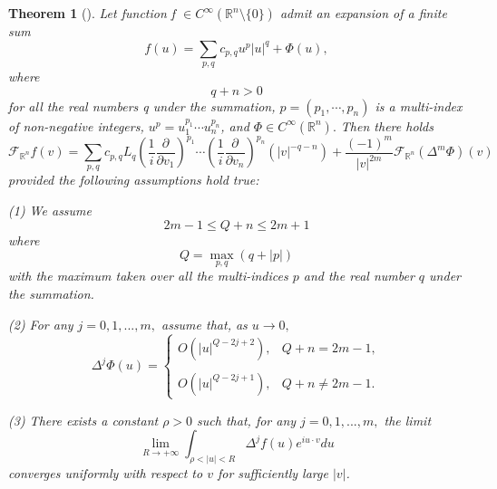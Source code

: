 \documentclass{amsart}
\newtheorem{theorem}{Theorem}[section]
\theoremstyle{definition}
\theoremstyle{remark}
\numberwithin{equation}{section}
\newcommand{\R}{\mathbb{R}}
\begin{document}
\begin{theorem} [\cite{SW1979}] \label{2023-09-30 17:52:36}
    Let function f $\in C^\infty(\R^n \setminus\{0\})$ admit an expansion of a finite sum
    \[
f(u)=\sum\limits_{p,q} c_{p,q} u^p |u|^q + \Phi(u),
\] where  \[
q+n>0
\] for all the real numbers q under the summation, $p =(p_1,\cdots,p_n)$ is a multi-index of non-negative integers,
    $u^p=u_1^{p_1}\cdots u_n^{p_n}$,
     and $\Phi \in C^\infty(\R^n).$  Then there holds \[
\mathcal F_{\R^n}   f(v)= \sum\limits_{p,q} c_{p,q}L_{q}
    \left (\frac{1}{i} \frac{\partial}{\partial v_1} \right)^{p_1} \cdots \left(\frac{1}{i} \frac{\partial}{\partial v_n} \right)^{p_n}
      (|v|^{-q-n}) + \dfrac{(-1)^m}{|v|^{2m}} \mathcal F_{\R^n} (\Delta ^m \Phi)(v)
\] provided the following assumptions hold true:

    (1) We assume \[
2m-1\leqslant Q +n \leqslant 2m +1
\] where \[
Q = \mathop{\max}\limits_{p,q} (q +|p|)
\] with the maximum taken over all the multi-indices $p$ and the real number $q$ under the summation.

    (2) For any $j = 0, 1,...,m,$   assume that, as $u \rightarrow 0,$ \[
\Delta^j \Phi(u)= \begin{cases}
        O(|u|^{Q-2j+2}),& Q+n=2m-1,\\\\
        O(|u|^{Q-2j+1}),&Q+n\neq 2m-1.
    \end{cases}
\]

    (3) There exists a constant $\rho>0$ such that, for any $j = 0, 1,...,m,$ the limit
        \[
\lim_{R\rightarrow +\infty} \int_{\rho < |u| < R} \Delta^j f(u) e^{iu\cdot v} d u
\]
    converges uniformly with respect to $v$ for sufficiently large $|v|$.
\end{theorem}
\end{document}
